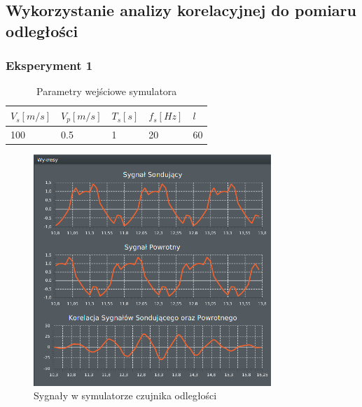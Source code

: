 \documentclass[12pt]{article}
\begin{document}
{        \subsection{Wykorzystanie analizy korelacyjnej do pomiaru odległości} {

            \subsubsection{Eksperyment 1} {
                \begin{table}[H]
                    \centering
                    \begin{tabular}{|l|l|l|l|l|}
                        \hline
                        $V_s[m/s]$ & $V_p[m/s]$ & $T_s[s]$ & $f_s[Hz]$ & $l$ \\ \hline
                        100        & 0.5        & 1        & 20        & 60 \\ \hline
                    \end{tabular}
                    \caption{Parametry wejściowe symulatora}
                \end{table}
                \begin{figure}[H]
                    \centering
                    \includegraphics[width=0.8\textwidth]{img/result/simulation/experiment1.png}
                    \caption{Sygnały w symulatorze czujnika odległości}
                \end{figure}
                \begin{table}[H]
                    \centering
                    \begin{tabular}{|l|l|l|}

\end{tabular}
\end{table}}}}
\end{document}
